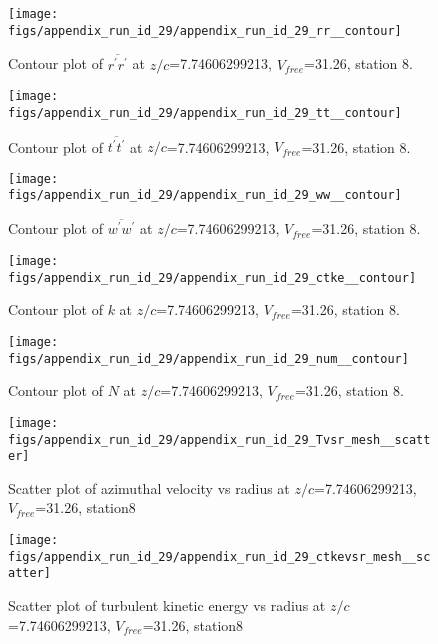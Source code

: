 \begin{figure}[H]
\centering
\texttt{[image: figs/appendix\_run\_id\_29/appendix\_run\_id\_29\_rr\_\_contour]}
\caption{Contour plot of $\overline{r^\prime r^\prime}$ at $z/c$=7.74606299213, $V_{free}$=31.26, station 8.}
\label{fig:appendix_run_id_29_rr__contour}
\end{figure}


\begin{figure}[H]
\centering
\texttt{[image: figs/appendix\_run\_id\_29/appendix\_run\_id\_29\_tt\_\_contour]}
\caption{Contour plot of $\overline{t^\prime t^\prime}$ at $z/c$=7.74606299213, $V_{free}$=31.26, station 8.}
\label{fig:appendix_run_id_29_tt__contour}
\end{figure}


\begin{figure}[H]
\centering
\texttt{[image: figs/appendix\_run\_id\_29/appendix\_run\_id\_29\_ww\_\_contour]}
\caption{Contour plot of $\overline{w^\prime w^\prime}$ at $z/c$=7.74606299213, $V_{free}$=31.26, station 8.}
\label{fig:appendix_run_id_29_ww__contour}
\end{figure}


\begin{figure}[H]
\centering
\texttt{[image: figs/appendix\_run\_id\_29/appendix\_run\_id\_29\_ctke\_\_contour]}
\caption{Contour plot of $k$ at $z/c$=7.74606299213, $V_{free}$=31.26, station 8.}
\label{fig:appendix_run_id_29_ctke__contour}
\end{figure}


\begin{figure}[H]
\centering
\texttt{[image: figs/appendix\_run\_id\_29/appendix\_run\_id\_29\_num\_\_contour]}
\caption{Contour plot of $N$ at $z/c$=7.74606299213, $V_{free}$=31.26, station 8.}
\label{fig:appendix_run_id_29_num__contour}
\end{figure}


\begin{figure}[H]
\centering
\texttt{[image: figs/appendix\_run\_id\_29/appendix\_run\_id\_29\_Tvsr\_mesh\_\_scatter]}
\caption{Scatter plot of azimuthal velocity vs radius at $z/c$=7.74606299213, $V_{free}$=31.26, station8}
\label{fig:appendix_run_id_29_Tvsr_mesh__scatter}
\end{figure}


\begin{figure}[H]
\centering
\texttt{[image: figs/appendix\_run\_id\_29/appendix\_run\_id\_29\_ctkevsr\_mesh\_\_scatter]}
\caption{Scatter plot of turbulent kinetic energy vs radius at $z/c$=7.74606299213, $V_{free}$=31.26, station8}
\label{fig:appendix_run_id_29_ctkevsr_mesh__scatter}
\end{figure}



